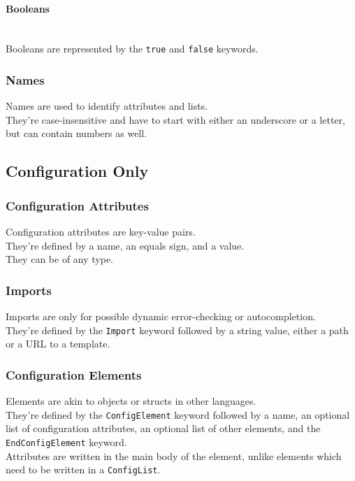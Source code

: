 \documentclass[12pt]{article}
\let\oldparagraph\paragraph
\renewcommand{\paragraph}[1]{\oldparagraph{#1}\mbox{}\\}
\begin{document}
    \paragraph{Booleans}
    Booleans are represented by the \texttt{true} and \texttt{false} keywords.

    \subsubsection{Names}
    Names are used to identify attributes and lists. \\
    They're case-insensitive and have to start with either an underscore or a letter, but can contain numbers as well.

    \newpage

    \subsection{Configuration Only}

    \subsubsection{Configuration Attributes}
    Configuration attributes are key-value pairs. \\
    They're defined by a name, an equals sign, and a value. \\
    They can be of any type.

    \subsubsection{Imports}
    Imports are only for possible dynamic error-checking or autocompletion. \\
    They're defined by the \texttt{Import} keyword followed by a string value, either a path or a URL to a template.

    \subsubsection{Configuration Elements}
    Elements are akin to objects or structs in other languages. \\
    They're defined by the \texttt{ConfigElement} keyword followed by a name, an optional list of configuration attributes, an optional list of other elements, and the \texttt{EndConfigElement} keyword. \\
    Attributes are written in the main body of the element, unlike elements which need to be written in a \texttt{ConfigList}.
\end{document}
